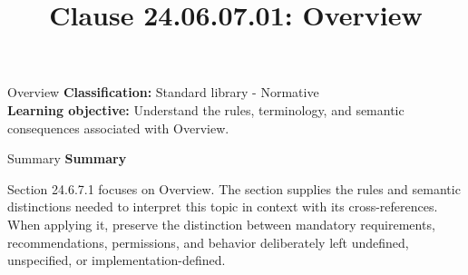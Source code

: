 \documentclass[10pt,letterpaper]{article}
\title{Clause 24.06.07.01: Overview}
\author{}
\date{}
\begin{document}
\maketitle
\begin{CornellOverviewBox}{Overview}
\textbf{Classification:} Standard library - Normative\\[2pt]
\textbf{Learning objective:} Understand the rules, terminology, and semantic consequences associated with Overview.
\end{CornellOverviewBox}\begin{CornellSummaryBox}{Summary}
{\sffamily\bfseries\color{Accent} Summary}\par\vspace{3pt}Section 24.6.7.1 focuses on Overview. The section supplies the rules and semantic distinctions needed to interpret this topic in context with its cross-references. When applying it, preserve the distinction between mandatory requirements, recommendations, permissions, and behavior deliberately left undefined, unspecified, or implementation-defined.
\end{CornellSummaryBox}
\end{document}
